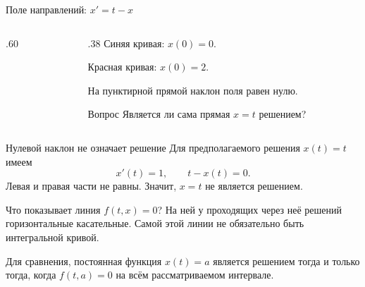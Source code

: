 \documentclass[aspectratio=169,11pt]{beamer}
\begin{document}
\begin{frame}{Поле направлений: $x'=t-x$}
  \begin{columns}[c]
    \begin{column}{.60\textwidth}
      \centering
    \end{column}
    \begin{column}{.38\textwidth}
      Синяя кривая: $x(0)=0$.
      \medskip

      Красная кривая: $x(0)=2$.
      \medskip

      На пунктирной прямой наклон поля равен нулю.
      \begin{alertblock}{Вопрос}
        Является ли сама прямая $x=t$ решением?
      \end{alertblock}
    \end{column}
  \end{columns}
\end{frame}

\begin{frame}{Нулевой наклон не означает решение}
  Для предполагаемого решения $x(t)=t$ имеем
  \[
    x'(t)=1,\qquad t-x(t)=0.
  \]
  Левая и правая части не равны. Значит, $x=t$ \alert{не является решением}.
  \begin{block}{Что показывает линия $f(t,x)=0$?}
    На ней у проходящих через неё решений горизонтальные касательные.
    Самой этой линии не обязательно быть интегральной кривой.
  \end{block}
  Для сравнения, постоянная функция $x(t)=a$ является решением
  тогда и только тогда, когда $f(t,a)=0$ на всём рассматриваемом интервале.
\end{frame}
\end{document}
